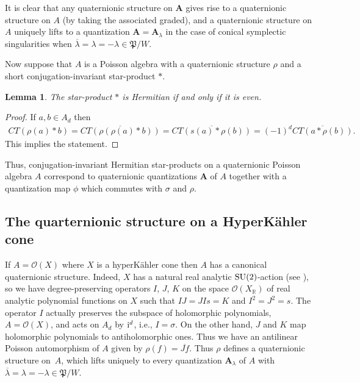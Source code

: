 \documentclass[pdftex]{sigma}
\numberwithin{equation}{section}
\newtheorem{Lemma}[Theorem]{Lemma}
\begin{document}
It is clear that any quaternionic structure on ${\mathbf A}$ gives rise to a quaternionic structure on $A$ (by taking the associated graded), and a quaternionic structure on $A$ uniquely lifts to a quantization ${\mathbf A}={\mathbf A}_\lambda$ in the case of conical symplectic singularities when $\overline{\lambda}=\lambda=-\lambda\in \mathfrak{P}/W$.

Now suppose that $A$ is a Poisson algebra with a quaternionic structure $\rho$ and a short conjugation-invariant star-product $*$.

\begin{Lemma} The star-product $*$ is Hermitian if and only if it is even.
\end{Lemma}

 \begin{proof} If $a,b\in A_d$ then
\begin{gather*}
CT(\rho(a)*b)=\overline{CT(\rho(\rho(a)*b))}=\overline{CT(s(a)*\rho(b))}=
(-1)^d\overline{CT(a*\rho(b))}.
\end{gather*}
This implies the statement.
\end{proof}

Thus, conjugation-invariant Hermitian star-products on a quaternionic Poisson algebra $A$ correspond to quaternionic quantizations ${\mathbf A}$ of $A$ together with a quantization map $\phi$ which commutes with $\sigma$ and $\rho$.

\subsection{The quarternionic structure on a HyperK\"ahler cone} \label{hypcoh}

If $A=\mathcal{O}(X)$ where $X$ is a hyperK\"ahler cone then $A$ has a canonical quaternionic structure. Indeed, $X$ has a natural real analytic ${\rm SU}(2)$-action (see \cite[Appendix~A and references therein]{BPR}), so we have degree-preserving operators $I$, $J$, $K$ on the space ${\mathcal O}(X_{{\mathbb R}})$ of real analytic polynomial functions on $X$ such that $IJ=JIs=K$ and $I^2=J^2=s$. The operator $I$ actually preserves the subspace of holomorphic polynomials, $A={\mathcal O}(X)$, and acts on $A_d$ by ${\rm i}^d$, i.e., $I=\sigma$. On the other hand, $J$ and $K$ map holomorphic polynomials to antiholomorphic ones. Thus we have an antilinear Poisson automorphism of $A$ given by $\rho(f)=\overline{Jf}$. Thus $\rho$ defines a quaternionic structure on~$A$, which lifts uniquely to every quantization ${\mathbf A}_\lambda$ of $A$ with $\overline{\lambda}=\lambda=-\lambda\in \mathfrak{P}/W$.
\end{document}
